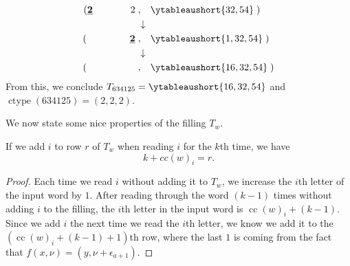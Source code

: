 \documentclass[ALCO, Unicode]{cedram}
\DeclareMathOperator{\ctype}{ctype}
\DeclareMathOperator{\cc}{cc}
\begin{document}
\begin{ex}
{\begin{align*}
     ( \mathbf{\underline{2}} \ \hspace{.2cm} \  \hspace{.2cm}  \  \hspace{.2cm} \ \hspace{.2cm} \ 2 \hspace{.1cm}&, \hspace{.3cm}\ytableaushort{32,54}\hspace{.1cm}) 
     \\ &\downarrow\\ 
     ( \hspace{.2cm}\ \hspace{.2cm} \  \hspace{.2cm}  \  \hspace{.2cm} \ \hspace{.2cm} \ \mathbf{\underline{2}}  \hspace{.1cm}&,\hspace{.3cm} \ytableaushort{1,32,54}\hspace{.1cm}) 
 \\ &\downarrow\\ 
     ( \hspace{.2cm}\ \hspace{.2cm} \  \hspace{.2cm}  \  \hspace{.2cm} \ \hspace{.2cm} \ \hspace{.2cm} \hspace{.1cm} &, \hspace{.3cm}\ytableaushort{16,32,54}\hspace{.1cm}) 
    \end{align*}}
    From this, we conclude $T_{634125} = \ytableaushort{16,32,54}$ and $\ctype(634125) = (2,2,2)$.
\end{ex}
We now state some nice properties of the filling $T_w$. 

\begin{lemma}\label{lemma:row is sum of cocharge label and mult}
    If we add $i$ to row $r$ of $T_w$ when reading $i$ for the $k$th time, we have
    \[k + cc(w)_i = r.\]
\end{lemma}
\begin{proof}
    Each time we read $i$ without adding it to $T_w$, we increase the $i$th letter of the input word by $1$. 
    After reading through the word $(k-1)$ times without adding $i$ to the filling, the $i$th letter in the input word is $\cc(w)_i + (k-1)$.
    Since we add $i$ the next time we read the $i$th letter, we know we add it to the $(\cc(w)_i + (k-1)+1)$th row, where the last $1$ is coming from the fact that $f(x,\nu) = (y,\nu +\epsilon_{a+1})$. 
\end{proof}
\end{document}
